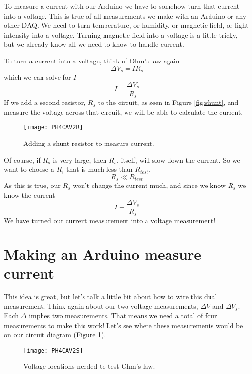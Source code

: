 To measure a current with our Arduino we have to somehow turn that current
into a voltage. This is true of all measurements we make with an Arduino
or any other DAQ. We need to
turn temperature, or humidity, or magnetic field, or light intensity into a
voltage. Turning magnetic field into a voltage is a little tricky, but we
already know all we need to know to handle current.

To turn a current into a voltage, think of Ohm's law again
\begin{equation*}
\Delta V_{s}=IR_{s}
\end{equation*}%
which we can solve for $I$%
\begin{equation*}
I=\frac{\Delta V_{s}}{R_{s}}
\end{equation*}%
If we add a second resistor, $R_{s}$ to the circuit, 
as seen in Figure \ref{fig:shunt},
and measure the voltage across
that circuit, we will be able to calculate the current.
\begin{figure}[htbp!]
	\centering
\texttt{[image: PH4CAV2R]}
	\caption[Adding a shunt resistor to measure current]{Adding a shunt
	resistor to measure current.}
\end{figure}

Of course, if $R_{s}$ is very large, then $R_{s}$, itself, will slow down
the current. So we want to choose a $R_{s}$ that is much less than 
$R_{test}$.
\begin{equation*}
R_{s}\ll R_{test}
\end{equation*}
As this is true, our $R_{s}$ won't change the current much, and
since we know $R_{s}$ we know the current 
\begin{equation*}
I=\frac{\Delta V_{s}}{R_{s}}
\end{equation*}%
We have turned our current measurement into a voltage measurement!

\section{Making an Arduino measure current}

This idea is great, but let's talk a little bit about how to wire this dual
measurement. Think again about our two voltage measurements, $\Delta V$ and $%
\Delta V_{s}.$ Each $\Delta $ implies two measurements. That means we need a
total of four measurements to make this work! Let's see where these
measurements would be on our circuit diagram (Figure \ref{fig:shunt2}).
\begin{figure}[htbp!]
	\centering
\texttt{[image: PH4CAV2S]}
	\caption[Voltage locations needed to test Ohm's law]{Voltage locations
	needed to test Ohm's law.}
	\label{fig:shunt2}
\end{figure}

